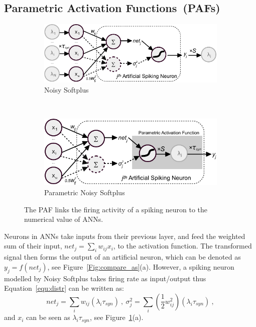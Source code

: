 \documentclass{article}
\begin{document}
\subsection{Parametric Activation Functions~(PAFs)}
\begin{figure}[tbh!]
	\centering
	\begin{subfigure}[t]{0.49\textwidth}
		\includegraphics[width=\textwidth]{pics_iconip/neuron_o.pdf}
		\caption{Noisy Softplus}
	\end{subfigure}~~~
	\begin{subfigure}[t]{0.42\textwidth}
		\includegraphics[width=\textwidth]{pics_iconip/neuron_PAF.pdf}
		\caption{Parametric Noisy Softplus}
	\end{subfigure}
	\caption{The PAF links the firing activity of a spiking neuron to the numerical value of ANNs.}
	\label{Fig:tneuron}
\end{figure}


Neurons in ANNs take inputs from their previous layer, and feed the weighted sum of their input, $net_j = \sum_i w_{ij}x_i$, to the activation function.
The transformed signal then forms the output of an artificial neuron, which can be denoted as $y_j=f(net_j)$, see Figure~\ref{Fig:compare_as}(a).
However, a spiking neuron modelled by Noisy Softplus takes firing rate as input/output thus Equation~\ref{equ:distr} can be written as:
\begin{equation}
net_j = \sum_i w_{ij}(\lambda_{i}\tau_{syn})~,
~\sigma^2_j= \sum_i (\frac{1}{2} w_{ij}^2)(\lambda_{i}\tau_{syn})~, 
\label{equ:mi_input}
\end{equation}
and $ x_i $ can be seen as $\lambda_{i}\tau_{syn}$, see Figure~\ref{Fig:tneuron}(a).
\end{document}

